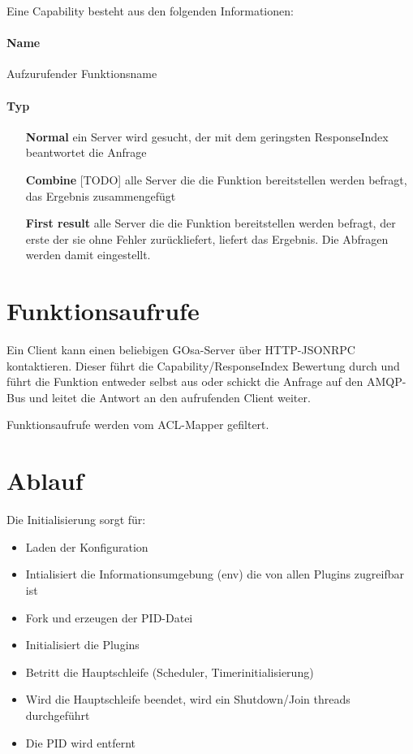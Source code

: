 Eine Capability besteht aus den folgenden Informationen:

\paragraph{Name}

Aufzurufender Funktionsname

\paragraph{Typ}

\begin{itemize}
\item[\bf Normal] ein Server wird gesucht, der mit dem geringsten ResponseIndex beantwortet die Anfrage
\item[\bf Combine] [TODO] alle Server die die Funktion bereitstellen werden befragt, das Ergebnis zusammengefügt
\item[\bf First result] alle Server die die Funktion bereitstellen werden befragt, der erste der sie ohne Fehler zurückliefert, liefert das Ergebnis. Die Abfragen werden damit eingestellt.
\end{itemize}


\section{Funktionsaufrufe}

Ein Client kann einen beliebigen GOsa-Server über HTTP-JSONRPC kontaktieren. Dieser führt die
Capability/ResponseIndex Bewertung durch und führt die Funktion entweder selbst aus oder
schickt die Anfrage auf den AMQP-Bus und leitet die Antwort an den aufrufenden Client
weiter.

Funktionsaufrufe werden vom ACL-Mapper gefiltert.


\section{Ablauf}

Die Initialisierung sorgt für:

\begin{itemize}
\item Laden der Konfiguration
\item Intialisiert die Informationsumgebung (env) die von allen Plugins zugreifbar ist
\item Fork und erzeugen der PID-Datei
\item Initialisiert die Plugins
\item Betritt die Hauptschleife (Scheduler, Timerinitialisierung)
\item Wird die Hauptschleife beendet, wird ein Shutdown/Join threads durchgeführt
\item Die PID wird entfernt
\end{itemize}


